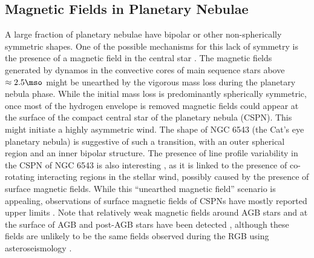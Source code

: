 \subsection{Magnetic Fields in Planetary Nebulae}
A large fraction of planetary nebulae have bipolar or other non-spherically symmetric shapes. 
One of the possible mechanisms for this lack of symmetry is the presence of a magnetic field in the central star \citep[See e.g.][]{Garc_a_Segura_1997,Chevalier_1994}. The magnetic fields generated by dynamos in the convective cores of main sequence stars above $\approx 2.5\mso$ might be unearthed by the vigorous mass loss during the planetary nebula phase. While the initial mass loss is predominantly spherically symmetric, once most of the hydrogen envelope is removed magnetic fields could appear at the surface of the compact central star of the planetary nebula (CSPN). This might initiate a highly asymmetric wind. The shape of NGC 6543 (the Cat's eye planetary nebula) is suggestive of such a transition, with an outer spherical region and an inner bipolar structure. The presence of line profile variability in the CSPN of NGC 6543 is also interesting \citep{Prinja_2012}, as it is linked to the presence of co-rotating interacting regions in the stellar wind, possibly caused by the presence of surface magnetic fields. While this ``unearthed magnetic field'' scenario is appealing, observations of surface magnetic fields of CSPNs have mostly reported upper limits \citep{Jordan_2012,Leone_2014,Asensio_Ramos_2014}. Note that relatively weak  magnetic fields around AGB stars \citep{Leal_Ferreira_2013} and at the surface of AGB and post-AGB stars have been detected \citep{L_bre_2014,Sabin_2014}, although these fields are unlikely to be the same fields observed during the RGB using asteroseismology \citep{Fuller_2015}. %


